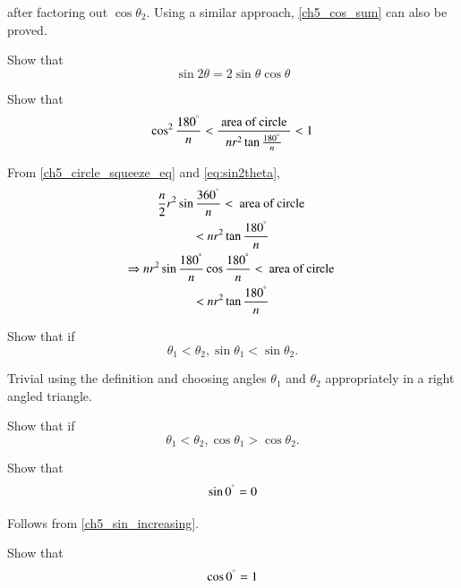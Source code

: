 %
after factoring out $\cos \theta_2$.  Using a similar approach, \eqref{ch5_cos_sum} can also be proved.
%
\begin{problem}
	Show that
	\begin{equation}
	\label{eq:sin2theta}
	\sin 2\theta = 2 \sin\theta \cos\theta
	\end{equation}
\end{problem}
\begin{problem}
Show that
	\begin{equation}
	\label{ch5_circle_squeeze_simple}
\cos^2\frac{180^{\degree}}{n} < \frac{\text{ area of circle }}{nr^{2}\tan\frac{180^{\degree}}{n}} < 1	\end{equation}
\end{problem}
\proof From \eqref{ch5_circle_squeeze_eq} and \eqref{eq:sin2theta},
	\begin{multline}
	\frac{n}{2}r^{2}\sin\frac{360^{\degree}}{n} < \text{ area of circle } 
	\\
	< nr^{2}\tan\frac{180^{\degree}}{n} 
	\\
\Rightarrow 	
	{n}r^{2}\sin\frac{180^{\degree}}{n}\cos\frac{180^{\degree}}{n} < \text{ area of circle } 
	\\
	< nr^{2}\tan\frac{180^{\degree}}{n} 
	\end{multline}
\begin{problem}
	Show that if
\begin{equation}
\label{ch5_sin_increasing}
\theta_1 < \theta_2, \sin \theta_1 < \sin \theta_2.
\end{equation}	
\end{problem}
\proof Trivial using the definition and choosing angles $\theta_1$ and $\theta_2$ appropriately in a right angled triangle.
%
	\begin{problem}
		Show that if
		\begin{equation}
		\label{ch5_sin_increasing}
		\theta_1 < \theta_2, \cos \theta_1 > \cos \theta_2.
		\end{equation}	
	\end{problem}
\begin{problem}
	Show that 
	\begin{equation}
	\label{ch5_sin_zero}
	\sin 0^{\degree} = 0
	\end{equation}
\end{problem}
\proof Follows from \eqref{ch5_sin_increasing}.
%
\begin{problem}
	Show that 
	\begin{equation}
	\label{ch5_sin_zero}
	\cos 0^{\degree} = 1
	\end{equation}
	\end{problem}
